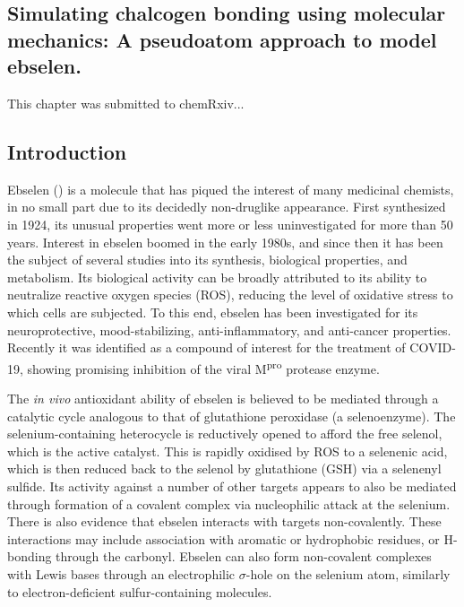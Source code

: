 \begin{refsection}

\chapter[Simulating chalcogen bonding using molecular mechanics]{Simulating chalcogen bonding using molecular mechanics: A pseudoatom approach to model ebselen.}

This chapter was submitted to chemRxiv...

\section{Introduction}
Ebselen () is a molecule that has piqued the interest of many medicinal chemists, in no small part due to its decidedly non-druglike appearance.
First synthesized in 1924, its unusual properties went more or less uninvestigated for more than 50 years.\autocite{Lesser1924}
Interest in ebselen boomed in the early 1980s, and since then it has been the subject of several studies into its synthesis, biological properties, and metabolism.\autocite{Weber1976,Renson1981,Muller1984,Wendel1984,Parnham1984,Engman1989,Schewe1995,Bhabak2010,Iwasaki2017}
Its biological activity can be broadly attributed to its ability to neutralize reactive oxygen species (ROS), reducing the level of oxidative stress to which cells are subjected.\autocite{Mugesh2000}
To this end, ebselen has been investigated for its neuroprotective, mood-stabilizing, anti-inflammatory, and anti-cancer properties.\autocite{Parnham1987,Kil2007,Singh2013,Azad2014,Parnham2000,Chantadul2020}
Recently it was identified as a compound of interest for the treatment of COVID-19, showing promising inhibition of the viral M\textsuperscript{pro} protease enzyme.\autocite{Jin2020}

The \emph{in vivo} antioxidant ability of ebselen is believed to be mediated through a catalytic cycle analogous to that of glutathione peroxidase (a selenoenzyme).\autocite{Antony2011}
The selenium-containing heterocycle is reductively opened to afford the free selenol, which is the active catalyst.
This is rapidly oxidised by ROS to a selenenic acid, which is then reduced back to the selenol by glutathione (GSH) via a selenenyl sulfide.
Its activity against a number of other targets appears to also be mediated through formation of a covalent complex via nucleophilic attack at the selenium.
There is also evidence that ebselen interacts with targets non-covalently.\autocite{Jin2020}
These interactions may include association with aromatic or hydrophobic residues, or H-bonding through the carbonyl.
Ebselen can also form non-covalent complexes with Lewis bases through an electrophilic $\sigma$-hole on the selenium atom, similarly to electron-deficient sulfur-containing molecules.\autocite{Thomas2015,Fellowes2019,Beno2015}


\end{refsection}
